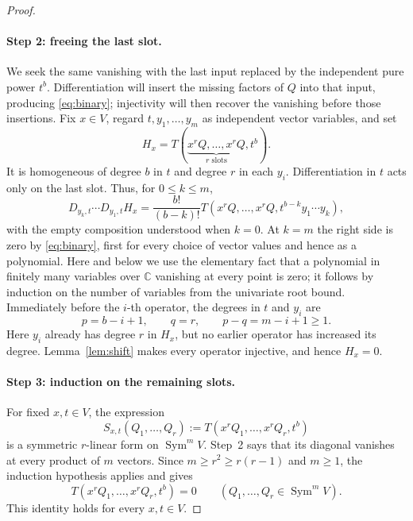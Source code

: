 \documentclass[11pt]{article}
\theoremstyle{remark}
\DeclareMathOperator{\Sym}{Sym}
\newcommand{\C}{\mathbb C}
\newcommand{\D}[2]{D_{#1,#2}}
\begin{document}
\begin{proof}
\paragraph{Step 2: freeing the last slot.}
We seek the same vanishing with the last input replaced by the independent
pure power $t^b$. Differentiation will insert the missing factors of $Q$
into that input, producing \eqref{eq:binary}; injectivity will then recover
the vanishing before those insertions. Fix $x\in V$, regard
$t,y_1,\ldots,y_m$ as independent vector variables, and set
\[
 H_x=T(\underbrace{x^rQ,\ldots,x^rQ}_{r\text{ slots}},t^b).
\]
It is homogeneous of degree $b$ in $t$ and degree $r$ in each $y_i$.
Differentiation in $t$ acts only on the last slot. Thus, for $0\le k\le m$,
\begin{equation}\label{eq:first-composition}
 \D{y_k}{t}\cdots\D{y_1}{t}H_x
 =\frac{b!}{(b-k)!}
 T(x^rQ,\ldots,x^rQ,t^{b-k}y_1\cdots y_k),
\end{equation}
with the empty composition understood when $k=0$.
At $k=m$ the right side is zero by \eqref{eq:binary}, first for every
choice of vector values and hence as a polynomial. Here and below we use
the elementary fact that a polynomial in finitely many variables over
$\C$ vanishing at every point is zero; it follows by induction on the
number of variables from the univariate root bound.
Immediately before the $i$-th operator, the degrees in $t$ and $y_i$ are
\[
 p=b-i+1,\qquad q=r,\qquad p-q=m-i+1\ge1.
\]
Here $y_i$ already has degree $r$ in $H_x$, but no earlier operator has
increased its degree. Lemma~\ref{lem:shift} makes every operator injective,
and hence $H_x=0$.

\paragraph{Step 3: induction on the remaining slots.}
For fixed $x,t\in V$, the expression
\[
 S_{x,t}(Q_1,\ldots,Q_r)
 :=T(x^rQ_1,\ldots,x^rQ_r,t^b)
\]
is a symmetric $r$-linear form on $\Sym^m V$. Step~2 says that its diagonal
vanishes at every product of $m$ vectors. Since
$m\ge r^2\ge r(r-1)$ and $m\ge1$, the induction hypothesis applies and gives
\begin{equation}\label{eq:inductive-vanishing}
 T(x^rQ_1,\ldots,x^rQ_r,t^b)=0
 \qquad(Q_1,\ldots,Q_r\in\Sym^m V).
\end{equation}
This identity holds for every $x,t\in V$.


\end{proof}
\end{document}
